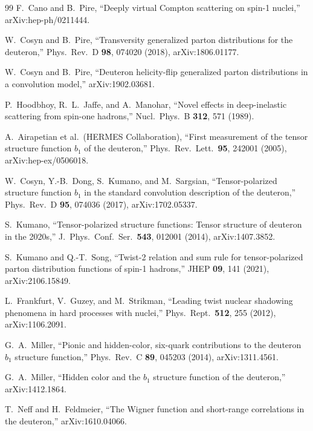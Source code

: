 \documentclass[11pt]{article}
\begin{document}
\begin{thebibliography}{99}
F.~Cano and B.~Pire,
``Deeply virtual Compton scattering on spin-1 nuclei,''
arXiv:hep-ph/0211444.

W.~Cosyn and B.~Pire,
``Transversity generalized parton distributions for the deuteron,''
Phys.\ Rev.\ D \textbf{98}, 074020 (2018), arXiv:1806.01177.

W.~Cosyn and B.~Pire,
``Deuteron helicity-flip generalized parton distributions in a convolution
model,''
arXiv:1902.03681.

P.~Hoodbhoy, R.~L.~Jaffe, and A.~Manohar,
``Novel effects in deep-inelastic scattering from spin-one hadrons,''
Nucl.\ Phys.\ B \textbf{312}, 571 (1989).

A.~Airapetian et al.\ (HERMES Collaboration),
``First measurement of the tensor structure function \(b_1\) of the
deuteron,''
Phys.\ Rev.\ Lett.\ \textbf{95}, 242001 (2005), arXiv:hep-ex/0506018.

W.~Cosyn, Y.-B.~Dong, S.~Kumano, and M.~Sargsian,
``Tensor-polarized structure function \(b_1\) in the standard convolution
description of the deuteron,''
Phys.\ Rev.\ D \textbf{95}, 074036 (2017), arXiv:1702.05337.

S.~Kumano,
``Tensor-polarized structure functions: Tensor structure of deuteron in the
2020s,''
J.\ Phys.\ Conf.\ Ser.\ \textbf{543}, 012001 (2014), arXiv:1407.3852.

S.~Kumano and Q.-T.~Song,
``Twist-2 relation and sum rule for tensor-polarized parton distribution
functions of spin-1 hadrons,''
JHEP \textbf{09}, 141 (2021), arXiv:2106.15849.

L.~Frankfurt, V.~Guzey, and M.~Strikman,
``Leading twist nuclear shadowing phenomena in hard processes with nuclei,''
Phys.\ Rept.\ \textbf{512}, 255 (2012), arXiv:1106.2091.

G.~A.~Miller,
``Pionic and hidden-color, six-quark contributions to the deuteron \(b_1\)
structure function,''
Phys.\ Rev.\ C \textbf{89}, 045203 (2014), arXiv:1311.4561.

G.~A.~Miller,
``Hidden color and the \(b_1\) structure function of the deuteron,''
arXiv:1412.1864.

T.~Neff and H.~Feldmeier,
``The Wigner function and short-range correlations in the deuteron,''
arXiv:1610.04066.


\end{thebibliography}
\end{document}
